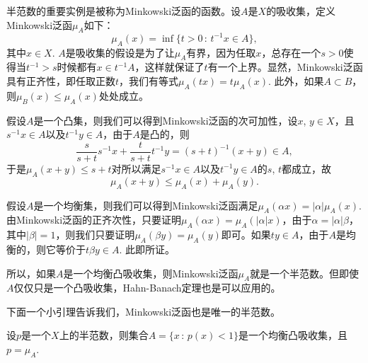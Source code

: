 
\begin{para}
半范数的重要实例是被称为Minkowski泛函的函数。设$A$是$X$的吸收集，定义Minkowski泛函$\mu_A$如下：
\[
	\mu_A(x)=\inf\{t>0\,:\,t^{-1}x\in A\},
\]
其中$x\in X$. $A$是吸收集的假设是为了让$\mu_A$有界，因为任取$x$，总存在一个$s>0$使得当$t^{-1}>s$时候都有$x\in t^{-1}A$，这样就保证了$t$有一个上界。显然，Minkowski泛函具有正齐性，即任取正数$t$，我们有等式$\mu_A(tx)=t\mu_A(x)$. 此外，如果$A\subset B$，则$\mu_B(x)\leq \mu_A(x)$处处成立。

假设$A$是一个凸集，则我们可以得到Minkowski泛函的次可加性，设$x$, $y\in X$，且$s^{-1}x\in A$以及$t^{-1}y\in A$，由于$A$是凸的，则
\[
	\frac{s}{s+t}s^{-1}x+\frac{t}{s+t}t^{-1}y=(s+t)^{-1}(x+y)\in A,
\]
于是$\mu_A(x+y)\leq s+t$对所以满足$s^{-1}x\in A$以及$t^{-1}y\in A$的$s$, $t$都成立，故
\[
	\mu_A(x+y)\leq \mu_A(x)+\mu_A(y).
\]

假设$A$是一个均衡集，则我们可以得到Minkowski泛函满足$\mu_A(\alpha x)=|\alpha|\mu_A(x)$. 由Minkowski泛函的正齐次性，只要证明$\mu_A(\alpha x)=\mu_A(|\alpha| x)$，由于$\alpha=|\alpha|\beta$，其中$|\beta|=1$，则我们只要证明$\mu_A(\beta y)=\mu_A(y)$即可。如果$ty\in A$，由于$A$是均衡的，则它等价于$t\beta y\in A$. 此即所证。

所以，如果$A$是一个均衡凸吸收集，则Minkowski泛函$\mu_A$就是一个半范数。但即使$A$仅仅只是一个凸吸收集，Hahn-Banach定理也是可以应用的。
\end{para}

下面一个小引理告诉我们，Minkowski泛函也是唯一的半范数。

\begin{lem}\label{1.54}
设$p$是一个$X$上的半范数，则集合$A=\{x\,:\, p(x)<1\}$是一个均衡凸吸收集，且$p=\mu_A$.
\end{lem}

